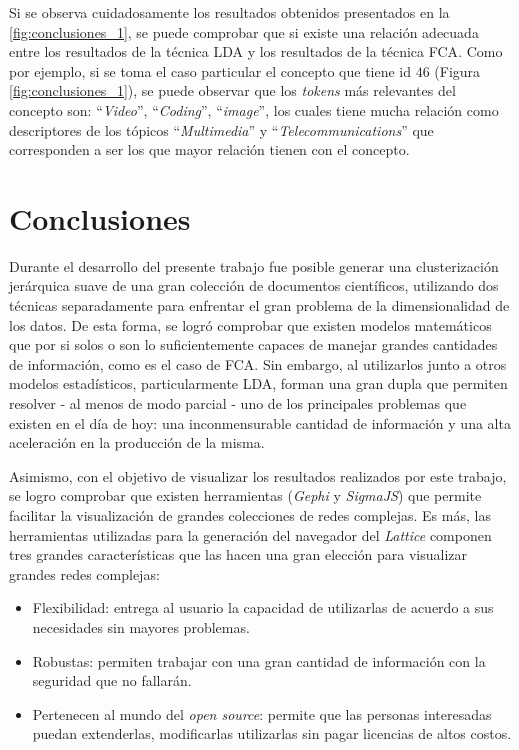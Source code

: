 \documentclass[12pt,oneside,letterpaper]{book}
\newcommand{\eng}[1]{\textit{#1}\xspace}			%
\newcommand{\abr}[1]{\textsc{#1}\xspace}           %
\theoremstyle{definition}
\begin{document}
Si se observa cuidadosamente los resultados obtenidos presentados en la \autoref{fig:conclusiones_1}, se puede comprobar que si existe una relación adecuada entre los resultados de la técnica \abr{LDA} y los resultados de la técnica \abr{FCA}. Como por ejemplo, si se toma el caso particular el concepto que tiene id $46$ (Figura \ref{fig:conclusiones_1}), se puede observar que los \eng{tokens} más relevantes del concepto son: ``\eng{Video}'', ``\eng{Coding}'', ``\eng{image}'', los cuales tiene mucha relación como descriptores de los tópicos ``\eng{Multimedia}'' y ``\eng{Telecommunications}'' que corresponden a ser los que mayor relación tienen con el concepto.

\chapter{Conclusiones}
\label{chap:conclutions}
Durante el desarrollo del presente trabajo fue posible generar una clusterización jerárquica suave de una gran colección de documentos científicos, utilizando dos técnicas separadamente para enfrentar el gran problema de la dimensionalidad de los datos. De esta forma, se logró comprobar que existen modelos matemáticos que por si solos o son lo suficientemente capaces de manejar grandes cantidades de información, como es el caso de \abr{FCA}. Sin embargo, al utilizarlos junto a otros modelos estadísticos, particularmente \abr{LDA}, forman una gran dupla que permiten resolver - al menos de modo parcial - uno de los principales problemas que existen en el día de hoy: una inconmensurable cantidad de información y una alta aceleración en la producción de la misma.

Asimismo, con el objetivo de visualizar los resultados realizados por este trabajo, se logro comprobar que existen herramientas (\eng{Gephi} y \eng{SigmaJS}) que permite facilitar la visualización de grandes colecciones de redes complejas. Es más, las herramientas utilizadas para la generación del navegador del \eng{Lattice} componen tres grandes características que las hacen una gran elección para visualizar grandes redes complejas:

\begin{itemize}
	\item Flexibilidad: entrega al usuario la capacidad de utilizarlas de acuerdo a sus necesidades sin mayores problemas.
	\item Robustas: permiten trabajar con una gran cantidad de información con la seguridad que no fallarán. 
   	\item Pertenecen al mundo del \eng{open source}: permite que las personas interesadas puedan extenderlas, modificarlas utilizarlas sin pagar licencias de altos costos.
\end{itemize}   
\end{document}

